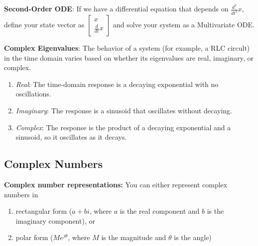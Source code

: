 \textbf{Second-Order ODE}: If we have a differential equation that depends on $\frac{d^2}{dt^2} x$, define your state vector as $\begin{bmatrix} x \\ \frac{d}{dt} x \end{bmatrix}$ and solve your system as a Multivariate ODE.

\textbf{Complex Eigenvalues}: The behavior of a system (for example, a RLC circult) in the time domain varies based on whether its eigenvalues are real, imaginary, or complex.
\begin{enumerate}
    \item \textit{Real}: The time-domain response is a decaying exponential with no oscillations.
    \item \textit{Imaginary}: The response is a sinusoid that oscillates without decaying.
    \item \textit{Complex}: The response is the product of a decaying exponential and a sinusoid, so it oscillates as it decays.
\end{enumerate}

\subsection*{Complex Numbers}
\textbf{Complex number representations:} You can either represent complex numbers in 
\begin{enumerate}
    \item rectangular form ($a + bi$, where $a$ is the real component and $b$ is the imaginary component), or
    \item polar form ($Me^{j \theta}$, where $M$ is the magnitude and $\theta$ is the angle)
\end{enumerate}

